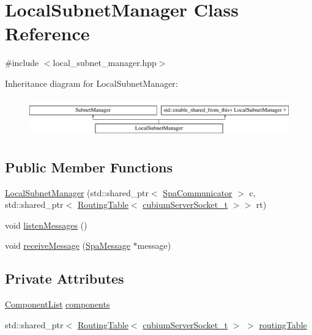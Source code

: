 \hypertarget{classLocalSubnetManager}{}\section{Local\+Subnet\+Manager Class Reference}
\label{classLocalSubnetManager}


{\ttfamily \#include $<$local\+\_\+subnet\+\_\+manager.\+hpp$>$}

Inheritance diagram for Local\+Subnet\+Manager\+:\begin{figure}[H]
\begin{center}
\leavevmode
\includegraphics[height=1.702128cm]{classLocalSubnetManager}
\end{center}
\end{figure}
\subsection*{Public Member Functions}
\begin{DoxyCompactItemize}
\item 
\hyperlink{classLocalSubnetManager_ae77d1c9d08c317f43e7a36d1ae8671f3}{Local\+Subnet\+Manager} (std\+::shared\+\_\+ptr$<$ \hyperlink{classSpaCommunicator}{Spa\+Communicator} $>$ c, std\+::shared\+\_\+ptr$<$ \hyperlink{classRoutingTable}{Routing\+Table}$<$ \hyperlink{structcubiumServerSocket__t}{cubium\+Server\+Socket\+\_\+t} $>$$>$ rt)
\item 
void \hyperlink{classLocalSubnetManager_a8cd2838196edcd75a77f532bce15c2fd}{listen\+Messages} ()
\item 
void \hyperlink{classLocalSubnetManager_a6eb06d8e5e5c3ae23552e3cde0f4c216}{receive\+Message} (\hyperlink{structSpaMessage}{Spa\+Message} $\ast$message)
\end{DoxyCompactItemize}
\subsection*{Private Attributes}
\begin{DoxyCompactItemize}
\item 
\hyperlink{classComponentList}{Component\+List} \hyperlink{classLocalSubnetManager_abc353dea714fbebbcd5dd37fab411299}{components}
\item 
std\+::shared\+\_\+ptr$<$ \hyperlink{classRoutingTable}{Routing\+Table}$<$ \hyperlink{structcubiumServerSocket__t}{cubium\+Server\+Socket\+\_\+t} $>$ $>$ \hyperlink{classLocalSubnetManager_afbdea942383e01998f54098eb157d89c}{routing\+Table}
\end{DoxyCompactItemize}
